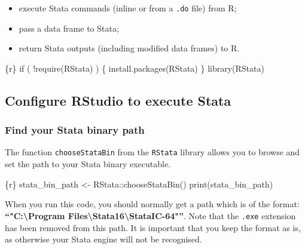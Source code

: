 \documentclass[
  letterpaper,
  DIV=11,
  numbers=noendperiod]{scrreprt}
\newenvironment{Shaded}{\begin{snugshade}}{\end{snugshade}}
\newcommand{\ControlFlowTok}[1]{\textcolor[rgb]{0.00,0.23,0.31}{#1}}
\newcommand{\FunctionTok}[1]{\textcolor[rgb]{0.28,0.35,0.67}{#1}}
\newcommand{\InformationTok}[1]{\textcolor[rgb]{0.37,0.37,0.37}{#1}}
\newcommand{\NormalTok}[1]{\textcolor[rgb]{0.00,0.23,0.31}{#1}}
\newcommand{\OtherTok}[1]{\textcolor[rgb]{0.00,0.23,0.31}{#1}}
\newcommand{\SpecialCharTok}[1]{\textcolor[rgb]{0.37,0.37,0.37}{#1}}
\newcommand{\StringTok}[1]{\textcolor[rgb]{0.13,0.47,0.30}{#1}}
\providecommand{\tightlist}{%
  \setlength{\itemsep}{0pt}\setlength{\parskip}{0pt}}\usepackage{longtable,booktabs,array}
\begin{document}
\begin{itemize}
\tightlist
\item
  execute Stata commands (inline or from a \texttt{.do} file) from R;
\item
  pass a data frame to Stata;
\item
  return Stata outputs (including modified data frames) to R.
\end{itemize}

\begin{Shaded}
\begin{Highlighting}[]
\InformationTok{\textasciigrave{}\textasciigrave{}\textasciigrave{}\{r\}}
\ControlFlowTok{if}\NormalTok{ ( }\SpecialCharTok{!}\FunctionTok{require}\NormalTok{(RStata) ) \{}
  \FunctionTok{install.packages}\NormalTok{(}\StringTok{\textquotesingle{}RStata\textquotesingle{}}\NormalTok{)}
\NormalTok{\}}
\FunctionTok{library}\NormalTok{(RStata)}
\InformationTok{\textasciigrave{}\textasciigrave{}\textasciigrave{}}
\end{Highlighting}
\end{Shaded}

\hypertarget{configure-rstudio-to-execute-stata}{%
\subsection{Configure RStudio to execute
Stata}\label{configure-rstudio-to-execute-stata}}

\hypertarget{find-your-stata-binary-path}{%
\subsubsection{Find your Stata binary
path}\label{find-your-stata-binary-path}}

The function \texttt{chooseStataBin} from the \texttt{RStata} library
allows you to browse and set the path to your Stata binary executable.

\begin{Shaded}
\begin{Highlighting}[]
\InformationTok{\textasciigrave{}\textasciigrave{}\textasciigrave{}\{r\}}
\NormalTok{stata\_bin\_path }\OtherTok{\textless{}{-}}\NormalTok{ RStata}\SpecialCharTok{::}\FunctionTok{chooseStataBin}\NormalTok{()}
\FunctionTok{print}\NormalTok{(stata\_bin\_path)}
\InformationTok{\textasciigrave{}\textasciigrave{}\textasciigrave{}}
\end{Highlighting}
\end{Shaded}

When you run this code, you should normally get a path which is of the
format: \textbf{``"C:\textbackslash Program
Files\textbackslash Stata16\textbackslash StataIC-64"''}. Note that the
\texttt{.exe} extension has been removed from this path. It is important
that you keep the format as is, as otherwise your Stata engine will not
be recognised.
\end{document}
